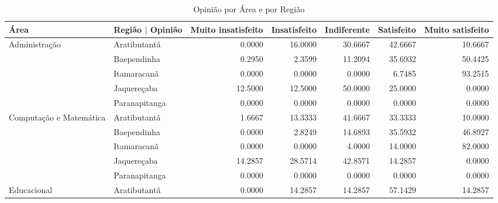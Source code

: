 \begin{table}[ht]
	\scriptsize
	\centering
	\caption{Opinião por Área e por Região} 
	\label{tabela:q15}
	\vspace{.5em}
\begin{tabular}{ll rrrrr}

  \toprule
 Área                    & Região $\vert$ Opinião & \multicolumn{1}{l}{ Muito insatisfeito} & \multicolumn{1}{l}{ Insatisfeito} & \multicolumn{1}{l}{ Indiferente} & \multicolumn{1}{l}{ Satisfeito} & \multicolumn{1}{l}{ Muito satisfeito} \\ 
   \midrule
Administração           & Aratibutantã            &             0.0000 &      16.0000 &     30.6667 &    42.6667 &          10.6667 \\ 
                          & Baependinha             &             0.2950 &       2.3599 &     11.2094 &    35.6932 &          50.4425 \\ 
                          & Itamaracanã             &             0.0000 &       0.0000 &      0.0000 &     6.7485 &          93.2515 \\ 
                          & Jaquereçaba             &            12.5000 &      12.5000 &     50.0000 &    25.0000 &           0.0000 \\ 
                          & Paranapitanga           &             0.0000 &       0.0000 &      0.0000 &     0.0000 &           0.0000 \\ 
  Computação e Matemática & Aratibutantã            &             1.6667 &      13.3333 &     41.6667 &    33.3333 &          10.0000 \\ 
                          & Baependinha             &             0.0000 &       2.8249 &     14.6893 &    35.5932 &          46.8927 \\ 
                          & Itamaracanã             &             0.0000 &       0.0000 &      4.0000 &    14.0000 &          82.0000 \\ 
                          & Jaquereçaba             &            14.2857 &      28.5714 &     42.8571 &    14.2857 &           0.0000 \\ 
                          & Paranapitanga           &             0.0000 &       0.0000 &      0.0000 &     0.0000 &           0.0000 \\ 
  Educacional             & Aratibutantã            &             0.0000 &      14.2857 &     14.2857 &    57.1429 &          14.2857 \\ 

\end{tabular}
\end{table}
